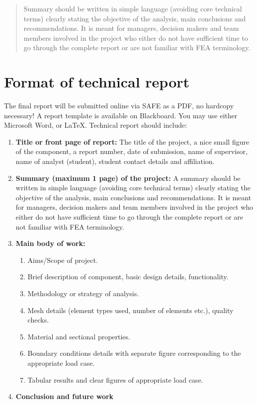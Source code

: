 \documentclass[11pt,a4paper,oneside]{memoir}
\begin{document}

\frontmatter
\renewcommand{\abstractname}{Summary}
\begin{abstract}
	Summary should be written in simple language (avoiding core technical terms) clearly stating the objective of the analysis, main conclusions and recommendations. It is meant for managers, decision makers and team members involved in the project who either do not have sufficient time to go through the complete report or are not familiar with FEA terminology. 
\end{abstract}

\clearpage
\tableofcontents%
\newpage
\listoffigures
\listoftables
\clearpage %

\mainmatter
{}
\pagestyle{ruled}

\chapter{Format of technical report}

The final report will be submitted online via SAFE as a PDF, no hardcopy necessary!
A report template is available on Blackboard. You may use either Microsoft Word, or \LaTeX. Technical report should include:
	\begin{enumerate}
		\item \textbf{Title or front page of report:} The title of the project, a nice small figure of the component, a report number, date of submission, name of supervisor, name of analyst (student), student contact details and affiliation.
		\item \textbf{Summary (maximum 1 page) of the project:} A summary should be written in simple language (avoiding core technical terms) clearly stating the objective of the analysis, main conclusions and recommendations. It is meant for managers, decision makers and team members involved in the project who either do not have sufficient time to go through the complete report or are not familiar with FEA terminology.
		\item \textbf{Main body of work:}
		\begin{enumerate}
			\item Aims/Scope of project.
			\item Brief description of component, basic design details, functionality.
			\item Methodology or strategy of analysis.
			\item Mesh details (element types used, number of elements etc.), quality checks.
			\item Material and sectional properties.
			\item Boundary conditions details with separate figure corresponding to the appropriate load case.
			\item Tabular results and clear figures of appropriate load case.
		\end{enumerate}
		\item \textbf{Conclusion and future work}
	\end{enumerate}
\end{document}
